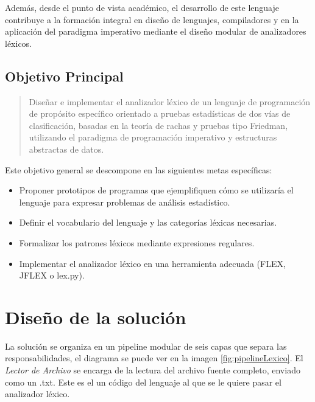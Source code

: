\documentclass{article}
\begin{document}
Además, desde el punto de vista académico, el desarrollo de este lenguaje contribuye a la formación integral en diseño de lenguajes, compiladores y en la aplicación del paradigma imperativo mediante el diseño modular de analizadores léxicos.


\subsection{Objetivo Principal}

\begin{quote}
Diseñar e implementar el analizador léxico de un lenguaje de programación de propósito específico orientado a pruebas estadísticas de dos vías de clasificación, basadas en la teoría de rachas y pruebas tipo Friedman, utilizando el paradigma de programación imperativo y estructuras abstractas de datos.
\end{quote}

Este objetivo general se descompone en las siguientes metas específicas:

\begin{itemize}
  \item Proponer prototipos de programas que ejemplifiquen cómo se utilizaría el lenguaje para expresar problemas de análisis estadístico.
  \item Definir el vocabulario del lenguaje y las categorías léxicas necesarias.
  \item Formalizar los patrones léxicos mediante expresiones regulares.
  \item Implementar el analizador léxico en una herramienta adecuada (FLEX, JFLEX o lex.py).
\end{itemize}

\section{Diseño de la solución}\label{sec:dis}


La solución se organiza en un pipeline modular de seis capas que separa 
las responsabilidades, el diagrama se puede ver en la imagen \ref{fig:pipelineLexico}.
El \emph{Lector de Archivo} se encarga de la lectura 
del archivo fuente completo, enviado como un .txt. Este es el
un código del lenguaje al que se le quiere pasar el analizador léxico.
\end{document}
